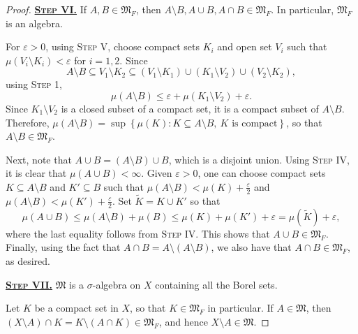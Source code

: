 \documentclass[11pt]{article}
\theoremstyle{thmstyle}
\theoremstyle{defstyle}
\newcommand{\frakM}{\mathfrak{M}} %
\newcommand{\wt}[1]{\widetilde{#1}}
\renewcommand{\le}{\leqslant}
\begin{document}
\begin{proof}
    \vspace{0.5cm}

    \noindent\underline{\textbf{\textsc{Step VI.}}} If $A, B\in\frakM_F$, then $A\setminus B, A\cup B, A\cap B\in\frakM_F$. In particular, $\frakM_F$ is an algebra.

    For $\varepsilon > 0$, using \textsc{Step V}, choose compact sets $K_i$ and open set $V_i$ such that $\mu(V_i\setminus K_i) < \varepsilon$ for $i = 1,2$. Since 
    \begin{equation*}
        A\setminus B\subseteq V_1\setminus K_2\subseteq (V_1\setminus K_1)\cup(K_1\setminus V_2)\cup(V_2\setminus K_2),
    \end{equation*}
    using \textsc{Step 1}, 
    \begin{equation*}
        \mu(A\setminus B)\le\varepsilon + \mu(K_1\setminus V_2) + \varepsilon.
    \end{equation*}
    Since $K_1\setminus V_2$ is a closed subset of a compact set, it is a compact subset of $A\setminus B$. Therefore, $\mu(A\setminus B) = \sup\left\{\mu(K)\colon K\subseteq A\setminus B,~K\text{ is compact}\right\}$, so that $A\setminus B\in\frakM_F$.

    Next, note that $A\cup B = (A\setminus B)\cup B$, which is a disjoint union. Using \textsc{Step IV}, it is clear that $\mu(A\cup B) < \infty$. Given $\varepsilon > 0$, one can choose compact sets $K\subseteq A\setminus B$ and $K'\subseteq B$ such that $\mu(A\setminus B) < \mu(K) + \frac{\varepsilon}{2}$ and $\mu(A\setminus B) < \mu(K') + \frac{\varepsilon}{2}$. Set $\wt K = K\cup K'$ so that 
    \begin{equation*}
        \mu(A\cup B)\le\mu(A\setminus B) + \mu(B)\le\mu(K) + \mu(K') + \varepsilon = \mu(\wt K) + \varepsilon,
    \end{equation*}
    where the last equality follows from \textsc{Step IV}. This shows that $A\cup B\in\frakM_F$. Finally, using the fact that $A\cap B = A\setminus(A\setminus B)$, we also have that $A\cap B\in\frakM_F$, as desired.

    \vspace{0.5cm}

    \noindent\underline{\textbf{\textsc{Step VII.}}} $\frakM$ is a $\sigma$-algebra on $X$ containing all the Borel sets.

    Let $K$ be a compact set in $X$, so that $K\in\frakM_F$ in particular. If $A\in\frakM$, then $(X\setminus A)\cap K = K\setminus(A\cap K)\in\frakM_F$, and hence $X\setminus A\in\frakM$.


\end{proof}
\end{document}
